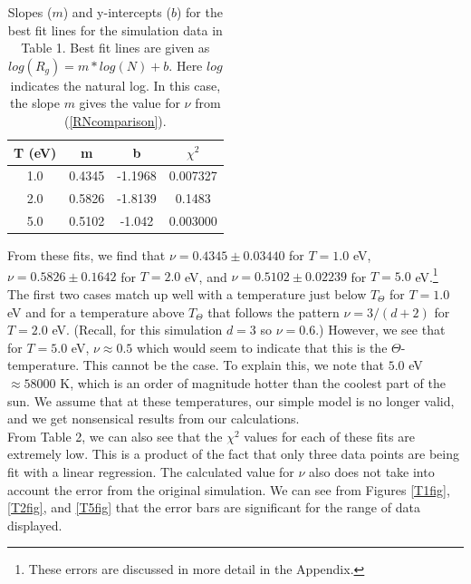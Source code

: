 \documentclass{article}
\begin{document}
\begin{multicols}{2}
\begin{table}
\begin{center}
\begin{tabular}{| c | c | c | c |}
\hline \textbf{T (eV)} & \textbf{m} & \textbf{b} & \textbf{$\chi ^2$} \\ \hline
1.0 & 0.4345 & -1.1968 & 0.007327 \\ \hline
2.0 & 0.5826 & -1.8139 & 0.1483 \\ \hline
5.0 & 0.5102 & -1.042 & 0.003000 \\ \hline
\end{tabular}
\caption{Slopes ($m$) and y-intercepts ($b$) for the best fit lines for the simulation data in Table 1.  Best fit lines are given as $log(R_g) = m*log(N) + b$.  Here $log$ indicates the natural log.  In this case, the slope $m$ gives the value for $\nu$ from (\ref{RNcomparison}).}
\end{center}
\end{table}

From these fits, we find that $\nu = 0.4345 \pm 0.03440$ for $T=1.0$ eV, $\nu = 0.5826 \pm 0.1642$ for $T = 2.0$ eV, and $\nu = 0.5102 \pm 0.02239$ for $T = 5.0$ eV.\footnote{These errors are discussed in more detail in the Appendix.}  The first two cases match up well with a temperature just below $T_{\Theta}$ for $T=1.0$ eV and for a temperature above $T_{\Theta}$ that follows the pattern $\nu = 3/(d+2)$ for $T = 2.0$ eV.  (Recall, for this simulation $d=3$ so $\nu = 0.6$.)  However, we see that for $T = 5.0$ eV, $\nu \approx 0.5$ which would seem to indicate that this is the $\Theta$-temperature. This cannot be the case.  To explain this, we note that $5.0$ eV $\approx 58000$ K, which is an order of magnitude hotter than the coolest part of the sun.  \cite{sun}  We assume that at these temperatures, our simple model is no longer valid, and we get nonsensical results from our calculations.  \\

From Table 2, we can also see that the $\chi^2$ values for each of these fits are extremely low.  This is a product of the fact that only three data points are being fit with a linear regression.  The calculated value for $\nu$ also does not take into account the error from the original simulation.  We can see from Figures \ref{T1fig}, \ref{T2fig}, and \ref{T5fig} that the error bars are significant for the range of data displayed.\\


\end{multicols}
\end{document}
